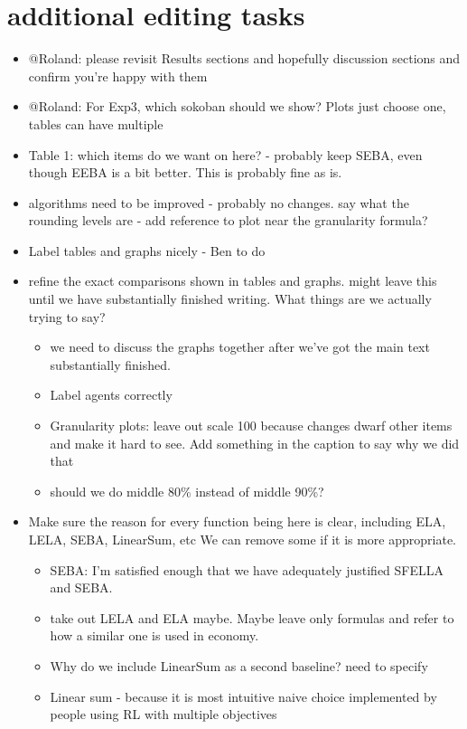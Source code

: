 \section*{additional editing tasks}
\begin{itemize}
    \item @Roland: please revisit Results sections and hopefully discussion sections and confirm you're happy with them
    \item @Roland: For Exp3, which sokoban should we show? Plots just choose one, tables can have multiple
    \item Table 1: which items do we want on here? - probably keep SEBA, even though EEBA is a bit better. This is probably fine as is.
    \item algorithms need to be improved - probably no changes. say what the rounding levels are - add reference to plot near the granularity formula?
    \item Label tables and graphs nicely - Ben to do
    \item refine the exact comparisons shown in tables and graphs. might leave this until we have substantially finished writing. What things are we actually trying to say?
    \begin{itemize}
        \item we need to discuss the graphs together after we've got the main text substantially finished.
        \item Label agents correctly
        \item Granularity plots: leave out scale 100 because changes dwarf other items and make it hard to see. Add something in the caption to say why we did that
        \item should we do middle 80\% instead of middle 90\%?
    \end{itemize}
    \item Make sure the reason for every function being here is clear, including ELA, LELA, SEBA, LinearSum, etc We can remove some if it is more appropriate.
    \begin{itemize}
        \item SEBA: I'm satisfied enough that we have adequately justified SFELLA and SEBA.
        \item take out LELA and ELA maybe. Maybe leave only formulas and refer to how a similar one is used in economy.
        \item Why do we include LinearSum as a second baseline? need to specify
        \item Linear sum - because it is most intuitive naive choice implemented by people using RL with multiple objectives

\end{itemize}
\end{itemize}
